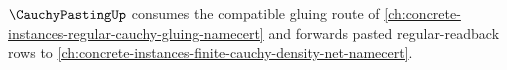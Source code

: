 $\CauchyPastingUp$ consumes the compatible gluing route of \autoref{ch:concrete-instances-regular-cauchy-gluing-namecert} and forwards pasted regular-readback rows to \autoref{ch:concrete-instances-finite-cauchy-density-net-namecert}.



